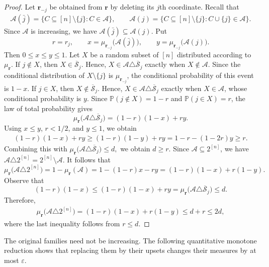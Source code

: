 \documentclass[11pt]{article}
\numberwithin{equation}{section}
\theoremstyle{definition}
\theoremstyle{remark}
\begin{document}
\begin{proof}
Let $\mathbf r_{-j}$ be obtained from $\mathbf r$ by deleting its
$j$th coordinate. Recall that 
$$
\begin{aligned}
\mathcal A(\bar j)
=
\{C\subseteq[n]\setminus\{j\}:C\in\mathcal A\},\qquad \mathcal A(j)
=
\{C\subseteq[n]\setminus\{j\}:
C\cup\{j\}\in\mathcal A\}.
\end{aligned}
$$
Since $\mathcal A$ is increasing, we have
$
\mathcal A(\bar j)\subseteq\mathcal A(j).
$
Put
$$
r=r_j,
\qquad
x=\mu_{\mathbf r_{-j}}\bigl(\mathcal A(\bar j)\bigr),
\qquad
y=\mu_{\mathbf r_{-j}}\bigl(\mathcal A(j)\bigr).
$$
Then
$
0\leq x\leq y\leq1.
$
Let $X$ be a random subset of $[n]$ distributed according to
$\mu_{\mathbf r}$. 
If $j\notin X$, then $X\in\overline{\mathcal S}_j$. Hence,
$X\in\mathcal A\triangle\overline{\mathcal S}_j$ exactly when
$X\notin\mathcal A$. Since the conditional distribution of
$X\setminus\{j\}$ is $\mu_{\mathbf r_{-j}}$, the conditional
probability of this event is $1-x$.
If $j\in X$, then $X\notin\overline{\mathcal S}_j$. Hence,
$X\in\mathcal A\triangle\overline{\mathcal S}_j$ exactly when
$X\in\mathcal A$, whose conditional probability is $y$.
Since $\mathbb P(j\notin X)=1-r$ and $\mathbb P(j\in X)=r$, the law
of total probability gives
$$
\mu_{\mathbf r}
\bigl(\mathcal A\triangle\overline{\mathcal S}_j\bigr)
=
(1-r)(1-x)+ry.
$$
Using $x\leq y$, $r<1/2$, and $y\leq1$, we obtain
$$
\begin{aligned}
(1-r)(1-x)+ry
\geq
(1-r)(1-y)+ry=
1-r-(1-2r)y\geq r.
\end{aligned}
$$
Combining this with
$
\mu_{\mathbf r}
\bigl(\mathcal A\triangle\overline{\mathcal S}_j\bigr)
\leq d,
$
we obtain $d\geq r$. 
Since $\mathcal A\subseteq2^{[n]}$, we have
$
\mathcal A\triangle2^{[n]}=2^{[n]}\setminus\mathcal A.
$
It follows that
$$
\mu_{\mathbf r}
\bigl(\mathcal A\triangle2^{[n]}\bigr)
=1-\mu_{\mathbf r}(\mathcal A)=1-(1-r)x-ry=
(1-r)(1-x)+r(1-y).
$$
Observe that
$$
(1-r)(1-x)
\leq
(1-r)(1-x)+ry
=
\mu_{\mathbf r}
\bigl(\mathcal A\triangle\overline{\mathcal S}_j\bigr)
\leq d.
$$
Therefore,
$$
\begin{aligned}
\mu_{\mathbf r}
\bigl(\mathcal A\triangle2^{[n]}\bigr)
=
(1-r)(1-x)+r(1-y)\leq
d+r\leq 2d,
\end{aligned}
$$
where the last inequality follows from $r\leq d$.
\end{proof}

The original families need not be increasing. The following
quantitative monotone reduction shows that replacing them by their
upsets changes their measures by at most $\varepsilon$.
\end{document}
